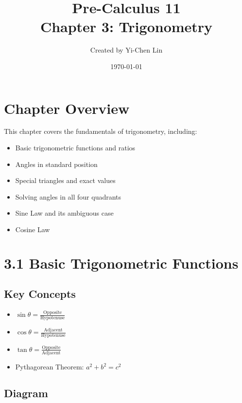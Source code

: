 \documentclass[12pt]{article}
\title{Pre-Calculus 11 \\ Chapter 3: Trigonometry}
\author{Created by Yi-Chen Lin}
\date{\today}
\begin{document}
\maketitle

\section*{Chapter Overview}
This chapter covers the fundamentals of trigonometry, including:
\begin{itemize}
    \item Basic trigonometric functions and ratios
    \item Angles in standard position
    \item Special triangles and exact values
    \item Solving angles in all four quadrants
    \item Sine Law and its ambiguous case
    \item Cosine Law
\end{itemize}

\section{3.1 Basic Trigonometric Functions}
\subsection*{Key Concepts}
\begin{tcolorbox}[colback=lightgray,colframe=primary,title=Trig Ratios]
    \begin{itemize}
        \item $\sin\theta = \frac{\text{Opposite}}{\text{Hypotenuse}}$
        \item $\cos\theta = \frac{\text{Adjacent}}{\text{Hypotenuse}}$
        \item $\tan\theta = \frac{\text{Opposite}}{\text{Adjacent}}$
        \item Pythagorean Theorem: $a^2 + b^2 = c^2$
    \end{itemize}
\end{tcolorbox}

\subsection*{Diagram}
\begin{center}
\end{center}
\end{document}
